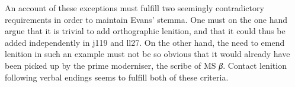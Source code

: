An account of these exceptions must fulfill two seemingly contradictory requirements in order to maintain Evans' stemma. One must on the one hand argue that it is trivial to add orthographic lenition, and that it could thus be added independently in \gls{j119} and \gls{ll27}. On the other hand, the need to emend lenition in such an example must not be so obvious that it would already have been picked up by the prime moderniser, the scribe of MS \textit{β}. Contact lenition following verbal endings seems to fulfill both of these criteria.





